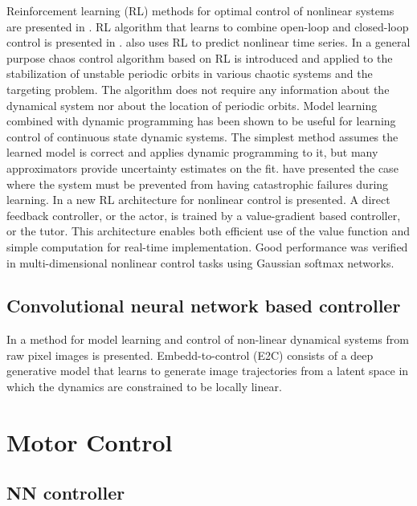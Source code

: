 \documentclass[conference]{IEEEtran}
\begin{document}
Reinforcement learning (RL) methods for optimal control of nonlinear systems are presented in \cite{HBZnips96, takashi2005nonlinear, sabino1999chaos, schnider1997nips, doya1996nips}. RL algorithm that learns to combine open-loop and closed-loop control is presented in \cite{HBZnips96}. \cite{takashi2005nonlinear} also uses RL to predict nonlinear time series. In \cite{sabino1999chaos} a general purpose chaos control algorithm based on RL is introduced and applied to the stabilization of unstable periodic orbits in various chaotic systems and the targeting problem. The algorithm does not require any information about the dynamical system nor about the location of periodic orbits. Model learning combined with dynamic programming has been shown to be useful for learning control of continuous state dynamic systems. The simplest method assumes the learned model is correct and applies dynamic programming to it, but many approximators provide uncertainty estimates on the fit. \cite{schnider1997nips} have presented the case where the system must be prevented from having catastrophic failures during learning. In \cite{doya1997nips} a new RL architecture for nonlinear control is presented. A direct feedback controller, or the actor, is trained by a value-gradient based controller, or the tutor. This architecture enables both efficient use of the value function and simple computation for real-time implementation. Good performance was verified in multi-dimensional nonlinear control tasks using Gaussian softmax networks.

\subsection{\textbf{Convolutional neural network based controller}}

In \cite{watter2015nips} a method for model learning and control of non-linear dynamical systems from raw pixel images is presented. Embedd-to-control (E2C) consists of a deep generative model that learns to generate image trajectories from a latent space in which the dynamics are constrained to be locally linear. \\

\section{Motor Control}

\subsection{\textbf{NN controller}}
\end{document}
